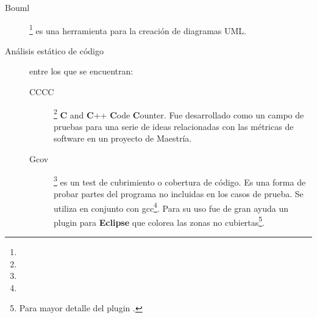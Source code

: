 \begin{description}
\item[Bouml]\footnote{} es una herramienta para la creación de diagramas UML.

\item [Análisis estático de código] entre los que se encuentran:

\begin{description}

\item [CCCC]\footnote{} \textbf{C} and \textbf{C}++ \textbf{C}ode \textbf{C}ounter. Fue desarrollado como un campo de pruebas para una serie de ideas relacionadas con las métricas de software en un proyecto de Maestría.

\item [Gcov]\footnote{} es un test de cubrimiento o cobertura de código. Es una forma de probar partes del programa no incluidas en los casos de prueba. Se utiliza en conjunto con gcc\footnote{}. Para su uso fue de gran ayuda un plugin para \textbf{Eclipse} que colorea las zonas no cubiertas\footnote{Para mayor detalle del plugin .}.
\end{description}

\end{description}